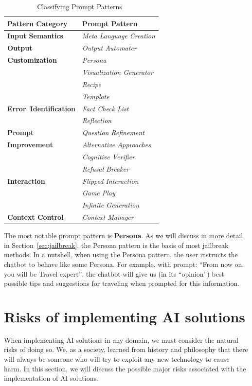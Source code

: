 \begin{table}[htpb]
    \caption{Classifying Prompt Patterns~\cite{white2023promptpatterncatalogenhance}}
    \centering
    \begin{tabular}{|l|l|}
        \hline \cellcolor[gray]{0.8}\textbf{Pattern Category} & \cellcolor[gray]{0.8}\textbf{Prompt Pattern} \\ \hline
        \textbf {Input Semantics} & \textit{Meta Language Creation} \\ \hline
        \textbf {Output} & \textit{Output Automater} \\
        \textbf {Customization} & \textit{Persona} \\
         & \textit{Visualization Generator} \\
         & \textit{Recipe} \\
         & \textit{Template} \\ \hline
        \textbf{\mbox{Error Identification}} & \textit{Fact Check List} \\
        & \textit{Reflection} \\ \hline
        \textbf {Prompt} & \textit{Question Refinement} \\
        \textbf {Improvement} & \textit{Alternative Approaches} \\
        & \textit{Cognitive Verifier} \\
        & \textit{Refusal Breaker} \\ \hline
        \textbf {Interaction} & \textit{Flipped Interaction} \\
        & \textit{Game Play} \\
        & \textit{Infinite Generation} \\ \hline
        \textbf{Context Control} & \textit{Context Manager} \\ \hline
    \end{tabular}
    \label{tab:prompt_patterns}
\end{table}

The most notable prompt pattern is \textbf{Persona}. As we will discuss in more detail in Section~\ref{sec:jailbreak}, the Persona pattern is the basis of most jailbreak methods. In a nutshell, when using the Persona pattern, the user instructs the chatbot to behave like some Persona. For example, with prompt: ``From now on, you will be Travel expert'', the chatbot will give us (in its ``opinion'') best possible tips and suggestions for traveling when prompted for this information.

\section{Risks of implementing AI solutions \label{sec:risks}}
When implementing AI solutions in any domain, we must consider the natural risks of doing so. We, as a society, learned from history and philosophy that there will always be someone who will try to exploit any new technology to cause harm. In this section, we will discuss the possible major risks associated with the implementation of AI solutions.

